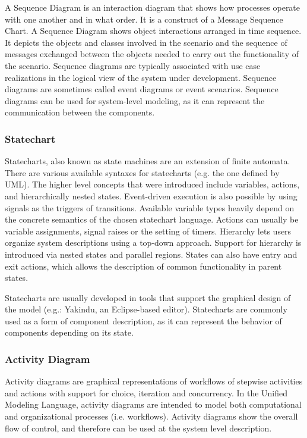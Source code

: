 A Sequence Diagram is an interaction diagram that shows how processes operate with one another and in what order. It is a construct of a Message Sequence Chart. A Sequence Diagram shows object interactions arranged in time sequence. It depicts the objects and classes involved in the scenario and the sequence of messages exchanged between the objects needed to carry out the functionality of the scenario. Sequence diagrams are typically associated with use case realizations in the logical view of the system under development. Sequence diagrams are sometimes called event diagrams or event scenarios. Sequence diagrams can be used for system-level modeling, as it can represent the communication between the components. 


\subsubsection{Statechart}

Statecharts, also known as state machines are an extension of finite automata. There are various available syntaxes for statecharts (e.g. the one defined by UML\citep{stcuml}). The higher level concepts that were introduced include variables, actions, and hierarchically nested states. Event-driven execution is also possible by using signals as the triggers of transitions. Available variable types heavily depend on the concrete semantics of the chosen statechart language. Actions can usually be variable assignments, signal raises or the setting of timers. Hierarchy lets users organize system descriptions using a top-down approach. Support for hierarchy is introduced via nested states and parallel regions. States can also have entry and exit actions, which allows the description of common functionality in parent states\citep{stcmove}.%

Statecharts are usually developed in tools that support the graphical design of the model (e.g.: Yakindu\citep{yakinduu}, an Eclipse-based editor).
Statecharts are commonly used as a form of component description, as it can represent the behavior of components depending on its state.

\subsubsection{Activity Diagram}

Activity diagrams are graphical representations of workflows of stepwise activities and actions with support for choice, iteration and concurrency. In the Unified Modeling Language, activity diagrams are intended to model both computational and organizational processes (i.e. workflows). Activity diagrams show the overall flow of control, and therefore can be used at the system level description.

